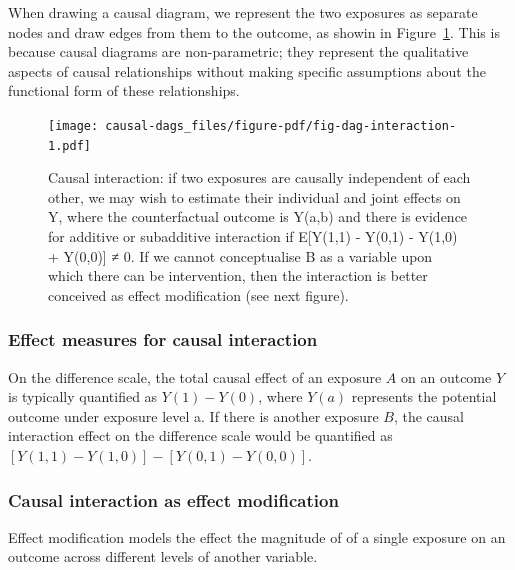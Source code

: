 \documentclass[
  singlecolumn]{report}
\begin{document}
When drawing a causal diagram, we represent the two exposures as
separate nodes and draw edges from them to the outcome, as showin in
Figure~\ref{fig-dag-interaction}. This is because causal diagrams are
non-parametric; they represent the qualitative aspects of causal
relationships without making specific assumptions about the functional
form of these relationships.

\begin{figure}

{\centering \texttt{[image: causal-dags\_files/figure-pdf/fig-dag-interaction-1.pdf]}

}

\caption{\label{fig-dag-interaction}Causal interaction: if two exposures
are causally independent of each other, we may wish to estimate their
individual and joint effects on Y, where the counterfactual outcome is
Y(a,b) and there is evidence for additive or subadditive interaction if
E{[}Y(1,1) - Y(0,1) - Y(1,0) + Y(0,0){]} ≠ 0. If we cannot conceptualise
B as a variable upon which there can be intervention, then the
interaction is better conceived as effect modification (see next
figure).}

\end{figure}

\hypertarget{effect-measures-for-causal-interaction}{%
\subsubsection{\texorpdfstring{\textbf{Effect measures for causal
interaction}}{Effect measures for causal interaction}}\label{effect-measures-for-causal-interaction}}

On the difference scale, the total causal effect of an exposure \(A\) on
an outcome \(Y\) is typically quantified as \(Y(1) - Y(0)\), where
\(Y(a)\) represents the potential outcome under exposure level a. If
there is another exposure \(B\), the causal interaction effect on the
difference scale would be quantified as
\([Y(1,1) - Y(1,0)] - [Y(0,1) - Y(0,0)]\).

\hypertarget{causal-interaction-as-effect-modification}{%
\subsubsection{\texorpdfstring{\textbf{Causal interaction as effect
modification}}{Causal interaction as effect modification}}\label{causal-interaction-as-effect-modification}}

Effect modification models the effect the magnitude of of a single
exposure on an outcome across different levels of another variable.
\end{document}
